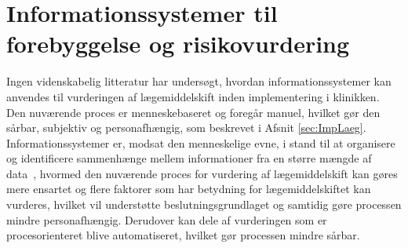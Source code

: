 
\section{Informationssystemer til forebyggelse og risikovurdering} \label{sec:Inform_Risk}

Ingen videnskabelig litteratur har undersøgt, hvordan informationssystemer kan anvendes til vurderingen af lægemiddelskift inden implementering i klinikken. Den nuværende proces er menneskebaseret og foregår manuel, hvilket gør den sårbar, subjektiv og personafhængig, som beskrevet i Afsnit \ref{sec:ImpLaeg}. Informationssystemer er, modsat den menneskelige evne, i stand til at organisere og identificere sammenhænge mellem informationer fra en større mængde af data~\citep{Agrawal2009}, hvormed den nuværende proces for vurdering af lægemiddelskift kan gøres mere ensartet og flere faktorer som har betydning for lægemiddelskiftet kan vurderes, hvilket vil understøtte beslutningsgrundlaget og samtidig gøre processen mindre personafhængig. Derudover kan dele af vurderingen som er procesorienteret blive automatiseret, hvilket gør processen mindre sårbar. 

